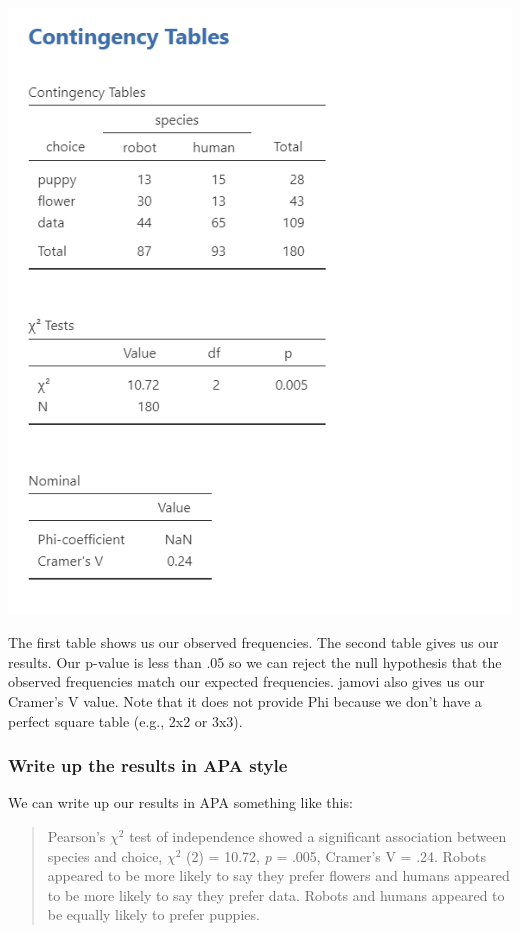 \documentclass[
]{book}
\begin{document}
\includegraphics{images/11-independence/independence_results.png}

The first table shows us our observed frequencies. The second table gives us our results. Our p-value is less than .05 so we can reject the null hypothesis that the observed frequencies match our expected frequencies. jamovi also gives us our Cramer's V value. Note that it does not provide Phi because we don't have a perfect square table (e.g., 2x2 or 3x3).

\hypertarget{write-up-the-results-in-apa-style-4}{%
\subsubsection{Write up the results in APA style}\label{write-up-the-results-in-apa-style-4}}

We can write up our results in APA something like this:

\begin{quote}
Pearson's \(\chi^2\) test of independence showed a significant association between species and choice, \(\chi^2\) (2) = 10.72, \emph{p} = .005, Cramer's V = .24. Robots appeared to be more likely to say they prefer flowers and humans appeared to be more likely to say they prefer data. Robots and humans appeared to be equally likely to prefer puppies.
\end{quote}
\end{document}
